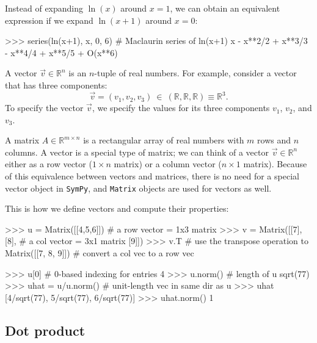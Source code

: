 Instead of expanding $\ln(x)$ around $x=1$,
we can obtain an equivalent expression if we expand $\ln(x+1)$ around $x=0$:



\small
\begin{verbatimtab}
>>> series(ln(x+1), x, 0, 6)   # Maclaurin series of ln(x+1)
x - x**2/2 + x**3/3 - x**4/4 + x**5/5 + O(x**6)
\end{verbatimtab}
\normalsize




\label{sec:sympytut_vectors}

A vector $\vec{v} \in \mathbb{R}^n$ is an $n$-tuple of real numbers. 
For example, consider a vector that has three components:  
\[
 \vec{v} = (v_1,v_2,v_3) \  \in \  (\mathbb{R},\mathbb{R},\mathbb{R}) \equiv \mathbb{R}^3.
\]
To specify the vector $\vec{v}$, 
we specify the values for its three components $v_1$, $v_2$, and $v_3$. 

A matrix $A \in \mathbb{R}^{m\times n}$ is a rectangular array of real numbers with $m$ rows and $n$ columns.
A vector is a special type of matrix; we can think of a vector $\vec{v}\in \mathbb{R}^n$
either as a row vector ($1\times n$ matrix) or a column vector ($n \times 1$ matrix).
Because of this equivalence between vectors and matrices,
there is no need for a special vector object in \texttt{SymPy}, 
and \texttt{Matrix} objects are used for vectors as well.

This is how we define vectors %
and compute their properties:

\small
\begin{verbatimtab}
>>> u = Matrix([[4,5,6]]) # a row vector = 1x3 matrix
>>> v = Matrix([[7],
                [8],      # a col vector = 3x1 matrix 
                [9]])
>>> v.T                   # use the transpose operation to 
Matrix([[7, 8, 9]])       # convert a col vec to a row vec

>>> u[0]                  # 0-based indexing for entries 
4
>>> u.norm()              # length of u 
sqrt(77)
>>> uhat = u/u.norm()     # unit-length vec in same dir as u
>>> uhat
[4/sqrt(77), 5/sqrt(77), 6/sqrt(77)]
>>> uhat.norm()
1
\end{verbatimtab}
\normalsize




\subsection{Dot product}
\label{vectors:dot_product}


